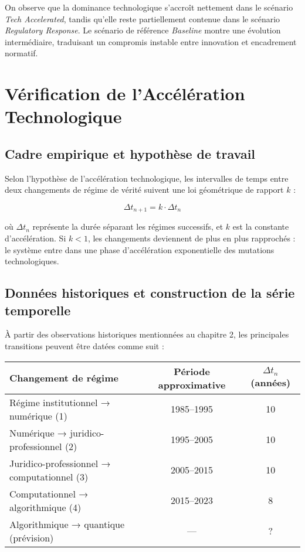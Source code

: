 \documentclass[12pt, a4em]{article}
\begin{document}
	\noindent
	On observe que la dominance technologique s’accroît nettement dans le scénario
	\textit{Tech Accelerated}, tandis qu’elle reste partiellement contenue dans le scénario
	\textit{Regulatory Response}. Le scénario de référence \textit{Baseline} montre une évolution
	intermédiaire, traduisant un compromis instable entre innovation et encadrement normatif.
	
	\section{ Vérification de l’Accélération Technologique}
	
	\subsection{ Cadre empirique et hypothèse de travail}
	
	Selon l’hypothèse de l’accélération technologique, les intervalles de temps entre deux changements de régime de vérité suivent une loi géométrique de rapport $k$ :
	
	\[
	\Delta t_{n+1} = k \cdot \Delta t_n
	\]
	
	où $\Delta t_n$ représente la durée séparant les régimes successifs, et $k$ est la constante d’accélération.  
	Si $k < 1$, les changements deviennent de plus en plus rapprochés : le système entre dans une phase d’accélération exponentielle des mutations technologiques.
	
	\subsection{ Données historiques et construction de la série temporelle}
	
	À partir des observations historiques mentionnées au chapitre 2, les principales transitions peuvent être datées comme suit :
	
	\begin{center}
		\begin{tabular}{lcc}
			\toprule
			\textbf{Changement de régime} & \textbf{Période approximative} & $\Delta t_n$ (années) \\
			\midrule
			Régime institutionnel → numérique (1) & 1985–1995 & 10 \\
			Numérique → juridico-professionnel (2) & 1995–2005 & 10 \\
			Juridico-professionnel → computationnel (3) & 2005–2015 & 10 \\
			Computationnel → algorithmique (4) & 2015–2023 & 8 \\
			Algorithmique → quantique (prévision) & — & ? \\
			\bottomrule
		\end{tabular}
	\end{center}
	
\end{document}

